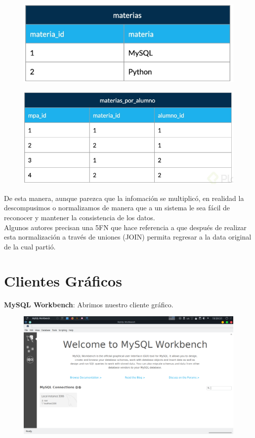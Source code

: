 \documentclass{article}
\begin{document}
\newpage

\begin{figure}[h!]
    \centering
      \includegraphics[scale=0.5]{./Pictures/034_normalizacion.png}
\end{figure}

\begin{figure}[h!]
    \centering
      \includegraphics[scale=0.5]{./Pictures/035_normalizacion.png}
\end{figure}

De esta manera, aunque parezca que la infomación se multiplicó, en realidad la
descompusimos o normalizamos de manera que a un sistema le sea fácil de
reconocer y mantener la consistencia de los datos.\\

Algunos autores precisan una 5FN que hace referencia a que después de realizar
esta normalización a través de uniones (JOIN) permita regresar a la data
original de la cual partió.

\newpage

\section{Clientes Gráficos}%
\textbf{MySQL Workbench}: Abrimos nuestro cliente gráfico.
\begin{figure}[h!]
  \centering
  \includegraphics[scale=0.47]{./Pictures/036_workbench.png}
\end{figure}
\end{document}
